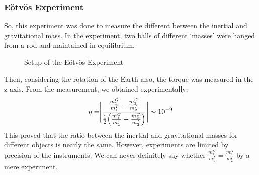 \subsubsection{E\"otv\"os Experiment}
So, this experiment was done to measure the different between the inertial and gravitational mass. In the experiment, two balls of different `masses' were hanged from a rod and maintained in equilibrium.
\begin{figure}[H]
    \centering
    
    \caption{Setup of the E\"otv\"os Experiment }
\end{figure} 
\noindent Then, considering the rotation of the Earth also, the torque was measured in the z-axis. From the measurement, we obtained experimentally:
$$\eta = \Biggr|\frac{\frac{m^G_1}{m^I_1}-\frac{m^G_2}{m^I_2}}{\frac{1}{2}\qty(\frac{m^G_1}{m^I_1}-\frac{m^G_2}{m^I_2})}\Biggr| \sim 10^{-9}$$
This proved that the ratio between the inertial and gravitational masses for different objects is nearly the same. However, experiments are limited by precision of the instruments. We can never definitely say whether $\frac{m^G_1}{m^I_1}=\frac{m^G_2}{m^I_2}$ by a mere experiment. 
